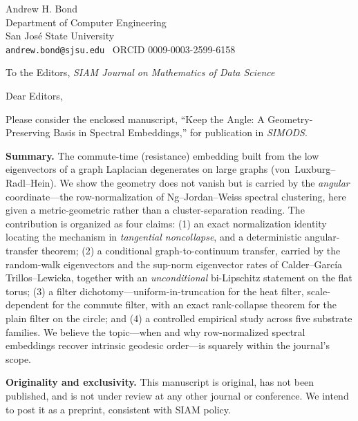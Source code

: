 \documentclass[11pt]{article}
\begin{document}
\hfill Andrew H. Bond\\
\hfill Department of Computer Engineering\\
\hfill San Jos\'e State University\\
\hfill \texttt{andrew.bond@sjsu.edu} \textbullet\ ORCID 0009-0003-2599-6158

\bigskip
To the Editors, \emph{SIAM Journal on Mathematics of Data Science}

\bigskip
Dear Editors,

Please consider the enclosed manuscript, ``Keep the Angle: A Geometry-Preserving
Basis in Spectral Embeddings,'' for publication in \emph{SIMODS}.

\textbf{Summary.} The commute-time (resistance) embedding built from the low
eigenvectors of a graph Laplacian degenerates on large graphs (von~Luxburg--Radl--Hein).
We show the geometry does not vanish but is carried by the \emph{angular}
coordinate---the row-normalization of Ng--Jordan--Weiss spectral clustering,
here given a metric-geometric rather than a cluster-separation reading. The
contribution is organized as four claims: (1) an exact normalization identity
locating the mechanism in \emph{tangential noncollapse}, and a deterministic
angular-transfer theorem; (2) a conditional graph-to-continuum transfer, carried
by the random-walk eigenvectors and the sup-norm eigenvector rates of
Calder--Garc\'ia Trillos--Lewicka, together with an \emph{unconditional}
bi-Lipschitz statement on the flat torus; (3) a filter dichotomy---uniform-in-truncation
for the heat filter, scale-dependent for the commute filter, with an exact
rank-collapse theorem for the plain filter on the circle; and (4) a controlled
empirical study across five substrate families. We believe the topic---when and
why row-normalized spectral embeddings recover intrinsic geodesic order---is
squarely within the journal's scope.

\textbf{Originality and exclusivity.} This manuscript is original, has not been
published, and is not under review at any other journal or conference. We intend
to post it as a preprint, consistent with SIAM policy.
\end{document}
